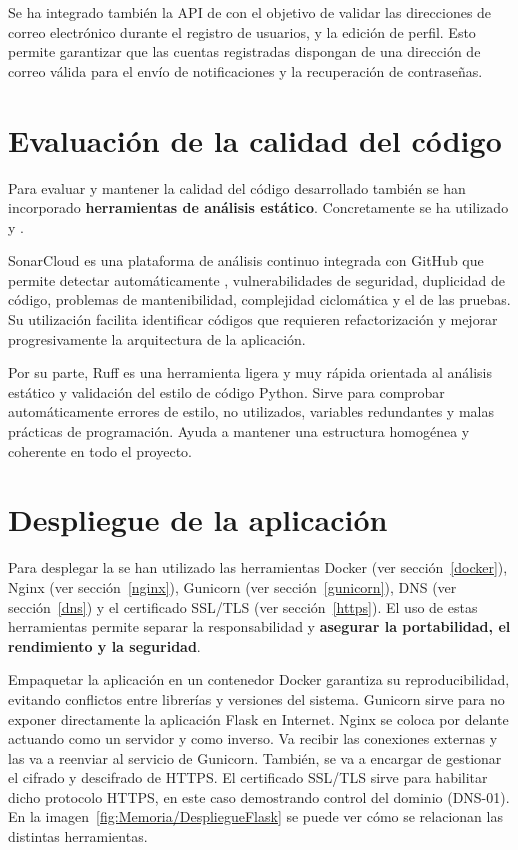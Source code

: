Se ha integrado también la API de  con el objetivo de validar las direcciones de correo electrónico durante el registro de usuarios, y la edición de perfil. Esto permite garantizar que las cuentas registradas dispongan de una dirección de correo válida para el envío de notificaciones y la recuperación de contraseñas.

\section{Evaluación de la calidad del código}

Para evaluar y mantener la calidad del código desarrollado también se han incorporado \textbf{herramientas de análisis estático}. Concretamente se ha utilizado  y .

SonarCloud es una plataforma de análisis continuo integrada con GitHub que permite detectar automáticamente , vulnerabilidades de seguridad, duplicidad de código, problemas de mantenibilidad, complejidad ciclomática y el  de las pruebas. Su utilización facilita identificar códigos que requieren refactorización y mejorar progresivamente la arquitectura de la aplicación. 

Por su parte, Ruff es una herramienta ligera y muy rápida orientada al análisis estático y validación del estilo de código Python. Sirve para comprobar automáticamente errores de estilo,  no utilizados, variables redundantes y malas prácticas de programación. Ayuda a mantener una estructura homogénea y coherente en todo el proyecto. 

\section{Despliegue de la aplicación}
Para desplegar la  se han utilizado las herramientas Docker (ver sección~\ref{docker}), Nginx (ver sección~\ref{nginx}), Gunicorn (ver sección~\ref{gunicorn}), DNS (ver sección~\ref{dns}) y el certificado SSL/TLS (ver sección~\ref{https}). El uso de estas herramientas permite separar la responsabilidad y \textbf{asegurar la portabilidad, el rendimiento y la seguridad}. 

Empaquetar la aplicación en un contenedor Docker garantiza su reproducibilidad, evitando conflictos entre librerías y versiones del sistema. Gunicorn sirve para no exponer directamente la aplicación Flask en Internet. Nginx se coloca por delante actuando como un servidor  y como  inverso. Va recibir las conexiones externas y las va a reenviar al servicio de Gunicorn. También, se va a encargar de gestionar el cifrado y descifrado de HTTPS. El certificado SSL/TLS sirve para habilitar dicho protocolo HTTPS, en este caso demostrando control del dominio (DNS-01). En la imagen~\ref{fig:Memoria/DespliegueFlask} se puede ver cómo se relacionan las distintas herramientas. 

